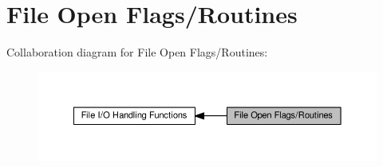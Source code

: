 \hypertarget{group__apr__file__open__flags}{}\section{File Open Flags/\+Routines}
\label{group__apr__file__open__flags}
Collaboration diagram for File Open Flags/\+Routines\+:
\nopagebreak
\begin{figure}[H]
\begin{center}
\leavevmode
\includegraphics[width=350pt]{group__apr__file__open__flags}
\end{center}
\end{figure}
